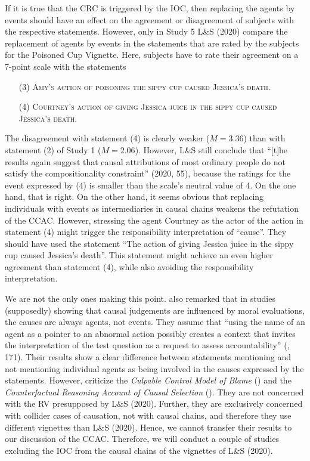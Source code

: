 \documentclass[egregdoesnotlikesansseriftitles,12pt]{scrartcl}
\begin{document}
If it is true that the CRC is triggered by the IOC, then replacing the agents by events should have an effect on the agreement or disagreement of subjects with the respective statements. However, only in Study 5 L\&S (2020) compare the replacement of agents by events in the statements that are rated by the subjects for the Poisoned Cup Vignette. Here, subjects have to rate their agreement on a 7-point scale with the statements 

\begin{itemize}
   \item[(3)]\textsc{Amy's action of poisoning the sippy cup caused Jessica's death.}
   \item[(4)]\textsc{Courtney's action of giving Jessica juice in the sippy cup caused Jessica's death.}
\end{itemize}

\noindent The disagreement with statement (4) is clearly weaker ($M = 3.36$) than with statement (2) of Study 1 ($M = 2.06$). However, L\&S still conclude that ``[t]he results again suggest that causal attributions of most ordinary people do not satisfy the compositionality constraint'' (2020, 55), because the ratings for the event expressed by (4) is smaller than the scale's neutral value of 4. On the one hand, that is right. On the other hand, it seems obvious that replacing individuals with events as intermediaries in causal chains weakens the refutation of the CCAC. However, stressing the agent Courtney as the actor of the action in statement (4) might trigger the responsibility interpretation of ``cause''. They should have used the statement ``The action of giving Jessica juice in the sippy cup caused Jessica's death''. This statement might achieve an even higher agreement than statement (4), while also avoiding the responsibility interpretation.

We are not the only ones making this point. \citet{samland_how_2016} also remarked that in studies (supposedly) showing that causal judgements are influenced by moral evaluations, the causes are always agents, not events. They assume that ``using the name of an agent as a pointer to an abnormal action possibly creates a context that invites the interpretation of the test question as a request to assess accountability'' (\cite{samland_how_2016}, 171). Their results show a clear difference between statements mentioning and not mentioning individual agents as being involved in the causes expressed by the statements. However, \citet{samland_how_2016} criticize the \textit{Culpable Control Model of Blame} (\cite{alicke_culpable_2000}) and the \textit{Counterfactual Reasoning Account of Causal Selection} (\cite{hitchcock_cause_2009}). They are not concerned with the RV presupposed by L\&S (2020). Further, they are exclusively concerned with collider cases of causation, not with causal chains, and therefore they use different vignettes than L\&S (2020). Hence, we cannot transfer their results to our discussion of the CCAC. Therefore, we will conduct a couple of studies excluding the IOC from the causal chains of the vignettes of L\&S (2020).
\end{document}
